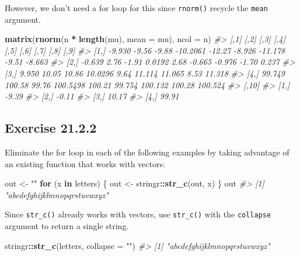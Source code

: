 \documentclass[]{book}
\newenvironment{Shaded}{\begin{snugshade}}{\end{snugshade}}
\newcommand{\CommentTok}[1]{\textcolor[rgb]{0.56,0.35,0.01}{\textit{#1}}}
\newcommand{\ControlFlowTok}[1]{\textcolor[rgb]{0.13,0.29,0.53}{\textbf{#1}}}
\newcommand{\DataTypeTok}[1]{\textcolor[rgb]{0.13,0.29,0.53}{#1}}
\newcommand{\KeywordTok}[1]{\textcolor[rgb]{0.13,0.29,0.53}{\textbf{#1}}}
\newcommand{\NormalTok}[1]{#1}
\newcommand{\OperatorTok}[1]{\textcolor[rgb]{0.81,0.36,0.00}{\textbf{#1}}}
\newcommand{\StringTok}[1]{\textcolor[rgb]{0.31,0.60,0.02}{#1}}
\theoremstyle{plain}
\theoremstyle{remark}
\theoremstyle{definition}
\theoremstyle{definition}
\theoremstyle{definition}
\theoremstyle{remark}
\begin{document}
However, we don't need a for loop for this since \texttt{rnorm()}
recycle the \texttt{mean} argument.

\begin{Shaded}
\begin{Highlighting}[]
\KeywordTok{matrix}\NormalTok{(}\KeywordTok{rnorm}\NormalTok{(n }\OperatorTok{*}\StringTok{ }\KeywordTok{length}\NormalTok{(mu), }\DataTypeTok{mean =}\NormalTok{ mu), }\DataTypeTok{ncol =}\NormalTok{ n)}
\CommentTok{#>        [,1]   [,2]  [,3]     [,4]   [,5]   [,6]    [,7]   [,8]    [,9]}
\CommentTok{#> [1,] -9.930  -9.56 -9.88 -10.2061 -12.27 -8.926 -11.178  -9.51  -8.663}
\CommentTok{#> [2,] -0.639   2.76 -1.91   0.0192   2.68 -0.665  -0.976  -1.70   0.237}
\CommentTok{#> [3,]  9.950  10.05 10.86  10.0296   9.64 11.114  11.065   8.53  11.318}
\CommentTok{#> [4,] 99.749 100.58 99.76 100.5498 100.21 99.754 100.132 100.28 100.524}
\CommentTok{#>      [,10]}
\CommentTok{#> [1,] -9.39}
\CommentTok{#> [2,] -0.11}
\CommentTok{#> [3,] 10.17}
\CommentTok{#> [4,] 99.91}
\end{Highlighting}
\end{Shaded}

\hypertarget{exercise-21.2.2}{%
\subsection*{\texorpdfstring{Exercise
{21.2.2}}{Exercise 21.2.2}}\label{exercise-21.2.2}}

Eliminate the for loop in each of the following examples by taking
advantage of an existing function that works with vectors:

\begin{Shaded}
\begin{Highlighting}[]
\NormalTok{out <-}\StringTok{ ""}
\ControlFlowTok{for}\NormalTok{ (x }\ControlFlowTok{in}\NormalTok{ letters) \{}
\NormalTok{  out <-}\StringTok{ }\NormalTok{stringr}\OperatorTok{::}\KeywordTok{str_c}\NormalTok{(out, x)}
\NormalTok{\}}
\NormalTok{out}
\CommentTok{#> [1] "abcdefghijklmnopqrstuvwxyz"}
\end{Highlighting}
\end{Shaded}

Since \texttt{str\_c()} already works with vectors, use
\texttt{str\_c()} with the \texttt{collapse} argument to return a single
string.

\begin{Shaded}
\begin{Highlighting}[]
\NormalTok{stringr}\OperatorTok{::}\KeywordTok{str_c}\NormalTok{(letters, }\DataTypeTok{collapse =} \StringTok{""}\NormalTok{)}
\CommentTok{#> [1] "abcdefghijklmnopqrstuvwxyz"}
\end{Highlighting}
\end{Shaded}
\end{document}
